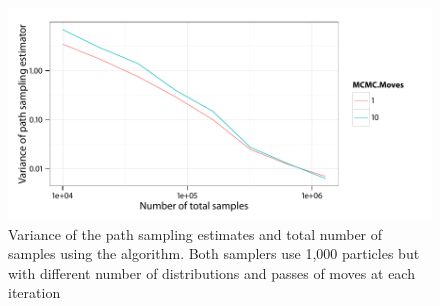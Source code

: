 \begin{figure}[t]
  \UseAltLinespread
  \includegraphics[width=\linewidth]{fig_src/MCMC_Iter_Var}
  \caption[Variance of path sampling estimator and total number of samples
  using \protect\smc algorithm]
  {Variance of the path sampling estimates and total number of samples
    using the \smc[2] algorithm. Both samplers use 1,000 particles but with
    different number of distributions and passes of \mcmc moves at each
    iteration}
  \label{fig:fast mcmc iter}
\end{figure}
